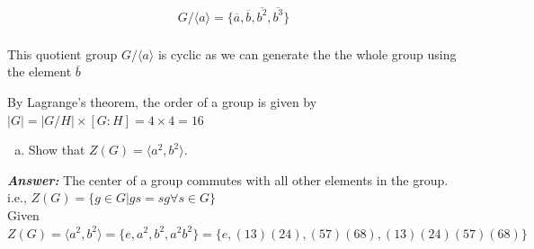 \documentclass[11pt,a4paper]{article}
\begin{document}
\begin{enumerate}[1.]
\begin{flushleft}
			\begin{multline*}
				G/\langle a \rangle = \{\displaystyle\overline{a}, \displaystyle\overline{b}, \displaystyle\overline{b^2}, \displaystyle\overline{b^3}\} \\
			\end{multline*}
			
			This quotient group $G/\langle a \rangle $ is cyclic as we can generate the the whole group using the element $\displaystyle\overline{b}$
			
			By Lagrange's theorem, the order of a group is given by $|G| = |G/H|\times[G:H] = 4\times4 = 16$
		\end{flushleft}
		
		\begin{enumerate}[(c)]
			\item Show that $Z(G) = \langle a^2, b^2 \rangle$.
		\end{enumerate}
		\begin{flushleft}
			\textbf{\textit{Answer:}} The center of a group commutes with all other elements in the group. i.e., $Z(G) = \{g \in G | gs = sg  \forall s \in G\}$\\
			
			Given $Z(G) =  \langle a^2, b^2 \rangle = \{e, a^2, b^2, a^2b^2\} = \{e, (13)(24), (57)(68), (13)(24)(57)(68)\}$
			

\end{flushleft}
\end{enumerate}
\end{document}
